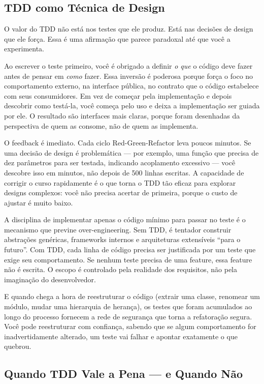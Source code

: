 \subsection{TDD como Técnica de Design}

O valor do TDD não está nos testes que ele produz. Está nas decisões de
design que ele força. Essa é uma afirmação que parece paradoxal até que você
a experimenta.

Ao escrever o teste primeiro, você é obrigado a definir \textit{o que} o código
deve fazer antes de pensar em \textit{como} fazer. Essa inversão é poderosa
porque força o foco no comportamento externo, na interface pública, no contrato
que o código estabelece com seus consumidores. Em vez de começar pela
implementação e depois descobrir como testá-la, você começa pelo uso e deixa a
implementação ser guiada por ele. O resultado são interfaces mais claras, porque
foram desenhadas da perspectiva de quem as consome, não de quem as implementa.

O feedback é imediato. Cada ciclo Red-Green-Refactor leva poucos minutos. Se
uma decisão de design é problemática --- por exemplo, uma função que precisa de
dez parâmetros para ser testada, indicando acoplamento excessivo --- você
descobre isso em minutos, não depois de 500 linhas escritas. A capacidade de
corrigir o curso rapidamente é o que torna o TDD tão eficaz para explorar
designs complexos: você não precisa acertar de primeira, porque o custo de
ajustar é muito baixo.

A disciplina de implementar apenas o código mínimo para passar no teste é o
mecanismo que previne over-engineering. Sem TDD, é tentador construir
abstrações genéricas, frameworks internos e arquiteturas extensíveis ``para o
futuro''. Com TDD, cada linha de código precisa ser justificada por um teste
que exige seu comportamento. Se nenhum teste precisa de uma feature, essa feature
não é escrita. O escopo é controlado pela realidade dos requisitos, não pela
imaginação do desenvolvedor.

E quando chega a hora de reestruturar o código (extrair uma classe, renomear
um módulo, mudar uma hierarquia de herança), os testes que foram acumulados
ao longo do processo fornecem a rede de segurança que torna a refatoração
segura. Você pode reestruturar com confiança, sabendo que se algum
comportamento for inadvertidamente alterado, um teste vai falhar e apontar
exatamente o que quebrou.

\subsection{Quando TDD Vale a Pena --- e Quando Não}

